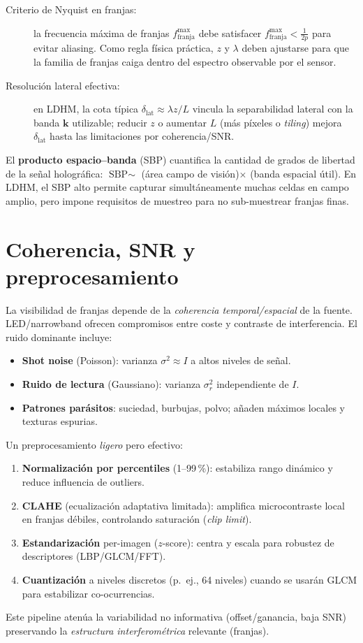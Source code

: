 \begin{description}
\item[Criterio de Nyquist en franjas:] la frecuencia máxima de franjas $f_\text{franja}^{\max}$ debe satisfacer $f_\text{franja}^{\max}<\frac{1}{2p}$ para evitar aliasing. Como regla física práctica, $z$ y $\lambda$ deben ajustarse para que la familia de franjas caiga dentro del espectro observable por el sensor.
\item[Resolución lateral efectiva:] en LDHM, la cota típica $\delta_{\text{lat}} \approx \lambda z/L$ vincula la separabilidad lateral con la banda $\mathbf{k}$ utilizable; reducir $z$ o aumentar $L$ (más píxeles o \emph{tiling}) mejora $\delta_{\text{lat}}$ hasta las limitaciones por coherencia/SNR.
\end{description}

El \textbf{producto espacio–banda} (SBP) cuantifica la cantidad de grados de libertad de la señal holográfica: $\text{SBP}\sim$ (área campo de visión)$\times$ (banda espacial útil). En LDHM, el SBP alto permite capturar simultáneamente muchas celdas en campo amplio, pero impone requisitos de muestreo para no sub-muestrear franjas finas.

\section{Coherencia, SNR y preprocesamiento}
La visibilidad de franjas depende de la \emph{coherencia temporal/espacial} de la fuente. LED/narrowband ofrecen compromisos entre coste y contraste de interferencia. El ruido dominante incluye:
\begin{itemize}
\item \textbf{Shot noise} (Poisson): varianza $\sigma^2 \approx I$ a altos niveles de señal.
\item \textbf{Ruido de lectura} (Gaussiano): varianza $\sigma_r^2$ independiente de $I$.
\item \textbf{Patrones parásitos}: suciedad, burbujas, polvo; añaden máximos locales y texturas espurias.
\end{itemize}
Un preprocesamiento \emph{ligero} pero efectivo:
\begin{enumerate}
\item \textbf{Normalización por percentiles} (1--99\,\%): estabiliza rango dinámico y reduce influencia de outliers.
\item \textbf{CLAHE} (ecualización adaptativa limitada): amplifica microcontraste local en franjas débiles, controlando saturación (\emph{clip limit})\cite{Zhou2019MedImageContrast}.
\item \textbf{Estandarización} per-imagen ($z$-score): centra y escala para robustez de descriptores (LBP/GLCM/FFT).
\item \textbf{Cuantización} a niveles discretos (p.~ej., 64 niveles) cuando se usarán GLCM para estabilizar co-ocurrencias.
\end{enumerate}
Este pipeline atenúa la variabilidad no informativa (offset/ganancia, baja SNR) preservando la \emph{estructura interferométrica} relevante (franjas).

